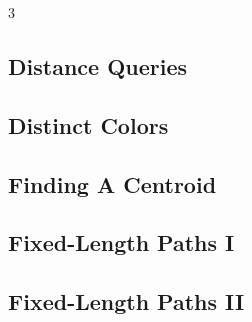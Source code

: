 \documentclass[8pt]{extarticle}
\begin{document}
\begin{multicols*}{3}
\subsection{Distance Queries}
\begin{caixaenunciado}

\end{caixaenunciado}
\vspace{0.3cm}


\subsection{Distinct Colors}
\begin{caixaenunciado}

\end{caixaenunciado}
\vspace{0.3cm}


\subsection{Finding A Centroid}
\begin{caixaenunciado}

\end{caixaenunciado}
\vspace{0.3cm}


\subsection{Fixed-Length Paths I}
\begin{caixaenunciado}

\end{caixaenunciado}
\vspace{0.3cm}


\subsection{Fixed-Length Paths II}
\begin{caixaenunciado}

\end{caixaenunciado}
\vspace{0.3cm}



\end{multicols*}
\end{document}

